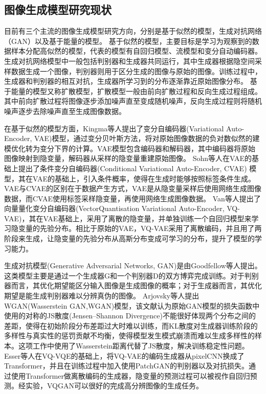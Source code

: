 \subsection{图像生成模型研究现状}
目前有三个主流的图像生成模型研究方向，分别是基于似然的模型，生成对抗网络（GAN）以及基于能量的模型\cite{luoUnderstandingDiffusionModels2022}。
基于似然的模型，主要目标是学习为观察到的数据样本分配高似然的模型，代表的模型有自回归模型、流模型和变分自动编码器。
生成对抗网络模型中一般包括判别器和生成器共同运行，其中生成器根据隐空间采样数据生成一个图像，判别器则用于区分生成的图像与原始的图像。训练过程中，生成器和判别器的相互对抗，生成器所学习到的分布逐渐靠近原始图像分布。
基于能量的模型又称扩散模型，扩散模型一般由前向扩散过程和反向生成过程组成。其中前向扩散过程将图像逐步添加噪声直至变成随机噪声，反向生成过程则将随机噪声逐步去除噪声直至生成图像数据。
\par
在基于似然的模型方面，Kingma\cite{kingmaAutoEncodingVariationalBayes2022}等人提出了变分自编码器(Variational Auto-Encoder, VAE)模型，通过变分贝叶斯方法，将对原始图像数据的负对数似然的建模优化转为变分下界的计算。VAE模型包含编码器和解码器，其中编码器将原始图像映射到隐变量，解码器从采样的隐变量重建原始图像。
Sohn\cite{sohnLearningStructuredOutput2015}等人在VAE的基础上提出了条件变分自编码器(Conditional Variational Auto-Encoder, CVAE) 模型，其在VAE的基础上，引入条件概率，使得在生成时能够按照标签条件生成。VAE与CVAE的区别在于数据产生方式，VAE是从隐变量采样后使用网络生成图像数据，而CVAE使用标签采样隐变量，再使用网络生成图像数据。
Van\cite{vandenoordNeuralDiscreteRepresentation2017}等人提出了向量量化变分自编码器(VectorQuantisation Variational Auto-Encoder, VQ-VAE)，其在VAE基础上，采用了离散的隐变量，并单独训练一个自回归模型来学习隐变量的先验分布。相比于原始的VAE，VQ-VAE采用了离散编码，并且用了两阶段来生成，让隐变量的先验分布从高斯分布变成可学习的分布，提升了模型的学习能力。
\par
生成对抗模型(Generative Adversarial Networks, GAN)是由Goodfellow\cite{goodfellowGenerativeAdversarialNetworks2014}等人提出。这类模型主要是通过一个生成器G和一个判别器D的双方博弈完成训练。对于判别器而言，其优化期望能区分输入图像是生成图像的概率；对于生成器而言，其优化期望是能生成判别器难以分辨真伪的图像。
Arjovsky\cite{arjovskyWassersteinGAN2017}等人提出WGAN(Wasserstein GAN,WGAN)模型，该文献认为原始GAN模型的损失函数中使用的对称的JS散度(Jensen–Shannon Divergence)不能很好体现两个分布之间的差距，使得在初始阶段分布差距过大时难以训练，而KL散度对生成器训练阶段的多样性与真实性的惩罚贡献不均衡，使得模型发生模式崩溃而难以生成多样性的样本。这项工作中使用了Wasserstein距离代替了JS散度，解决训练稳定性问题。
Esser\cite{esserTamingTransformersHighResolution2021}等人在VQ-VQE的基础上，将VQ-VAE的编码生成器从pixelCNN换成了Transformer，并且在训练过程中加入使用PatchGAN的判别器以及对抗损失。通过使用Transformer做离散编码的生成器，隐变量的预测过程可以被视作自回归预测。经实验，VQGAN可以很好的完成高分辨图像的生成任务。

